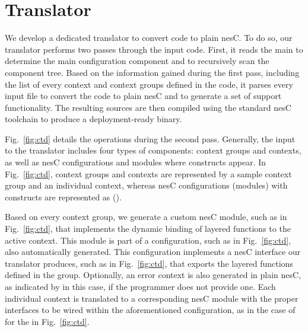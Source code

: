  \section{Translator}\label{sec:translator}

 We develop a dedicated translator to convert \conesc code to plain
 nesC. To do so, our translator performs two passes through the input
 code. First, it reads the main  to determine the main
 configuration component and to recursively scan the component
 tree. Based on the information gained during the first pass,
 including the list of every context and context groups defined in the
 code, it parses every input file to convert the \conesc code to plain
 nesC and to generate a set of support functionality. The resulting
 sources are then compiled using the standard nesC toolchain to
 produce a deployment-ready binary.


Fig.~\ref{fig:ctd} details the operations during the second
pass. Generally, the input to the translator includes four types of
components: context groups and contexts, as well as nesC
configurations and modules where \conesc constructs appear.  In
Fig.~\ref{fig:ctd}, context groups and contexts are represented by a
sample  context group and an individual 
context, whereas nesC configurations (modules) with \conesc
constructs are represented as  ().

Based on every context group, we generate a custom nesC module, such
as  in Fig.~\ref{fig:ctd}, that implements the
dynamic binding of layered functions to the active context. This
module is part of a configuration, such as  in
Fig.~\ref{fig:ctd}, also automatically generated. This configuration
implements a nesC interface our translator produces, such as
 in Fig.~\ref{fig:ctd}, that exports the layered
functions defined in the group. Optionally, an error context is also
generated in plain nesC, as indicated by  in this
case, if the programmer does not provide one. Each individual context
is translated to a corresponding nesC module with the proper
interfaces to be wired within the aforementioned configuration, as in
the case of  for the  in
Fig.~\ref{fig:ctd}.

